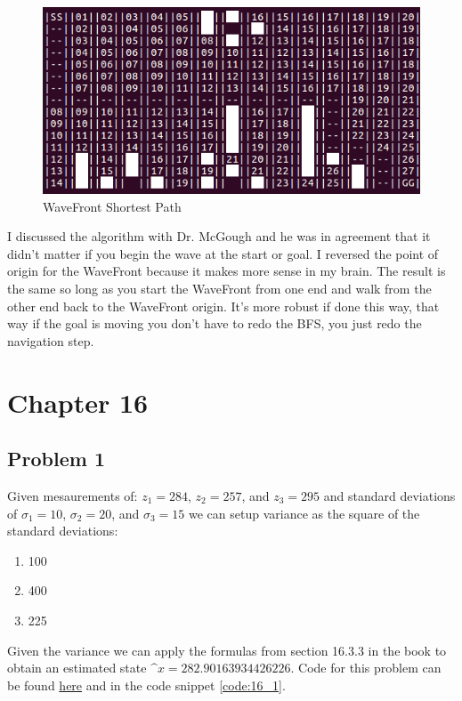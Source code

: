 \documentclass{article}
\begin{document}
\begin{figure}[h]
    \centering
    \includegraphics[scale=2.5]{problem11_3_2}
    \caption{WaveFront Shortest Path}
    \label{fig:p11_3_2}
\end{figure}

I discussed the algorithm with Dr. McGough and he was in agreement that it 
didn't matter if you begin the wave at the start or goal. I reversed the point 
of origin for the WaveFront because it makes more sense in my brain. The result 
is the same so long as you start the WaveFront from one end and walk from the 
other end back to the WaveFront origin. It's more robust if done this way, that 
way if the goal is moving you don't have to redo the BFS, you just redo the 
navigation step.


\newpage
\section{\textbf{Chapter 16}}
\subsection{Problem 1}
Given mesaurements of: $z_1 = 284$, $z_2 = 257$, and $z_3 = 295$ and standard 
deviations of $\sigma_1 = 10$, $\sigma_2 = 20$, and $\sigma_3 = 15$ we can setup 
variance as the square of the standard deviations:

\begin{enumerate}
    \item 100
    \item 400
    \item 225
\end{enumerate}

Given the variance we can apply the formulas from section 16.3.3 in the book to 
obtain an estimated state $\^{x} = 282.90163934426226$. Code for this problem 
can be found 
\href{https://github.com/macattackftw/RoboticsHW/blob/master/HW5/problem16_1.py}{here} 
and in the code snippet \ref{code:16_1}.
\end{document}
